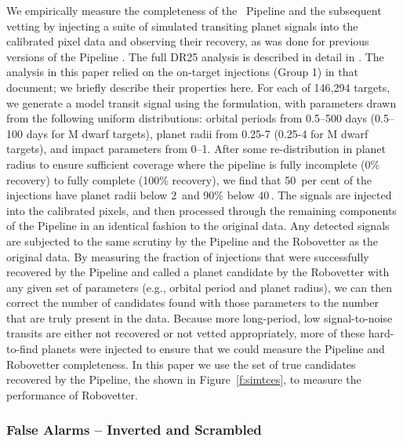 We empirically measure the completeness of the \Kepler\ Pipeline and the subsequent vetting by injecting a suite of simulated transiting planet signals into the calibrated pixel data and observing their recovery, as was done for previous versions of the \Kepler{} Pipeline \citep{Christiansen2013a,Christiansen2015,Christiansen2016}. The full DR25 analysis is described in detail in \citet{Christiansen2017}. The analysis in this paper relied on the on-target injections (Group 1) in that document; we briefly describe their properties here. For each of 146,294 targets, we generate a model transit signal using the \citet{Mandel2002} formulation, with parameters drawn from the following uniform distributions: orbital periods from 0.5--500 days (0.5--100 days for M dwarf targets), planet radii from 0.25-7 \re{} (0.25-4 \re{} for M dwarf targets), and impact parameters from 0--1. After some re-distribution in planet radius to ensure sufficient coverage where the pipeline is fully incomplete (0\% recovery) to fully complete (100\% recovery), we find that 50~per cent of the injections have planet radii below 2\,\re{} and 90\% below 40\,\re{}. The signals are injected into the calibrated pixels, and then processed through the remaining components of the \Kepler{} Pipeline in an identical fashion to the original data. Any detected signals are subjected to the same scrutiny by the Pipeline and the Robovetter as the original data. By measuring the fraction of injections that were successfully recovered by the Pipeline and called a planet candidate by the Robovetter with any given set of parameters (e.g., orbital period and planet radius), we can then correct the number of candidates found with those parameters to the number that are truly present in the data. Because more long-period, low signal-to-noise transits are either not recovered or not vetted appropriately, more of these hard-to-find planets were injected to ensure that we could measure the Pipeline and Robovetter completeness. In this paper we use the set of true candidates recovered by the Pipeline, the  shown in Figure~\ref{f:simtces}, to measure the performance of Robovetter.


\subsubsection{False Alarms -- Inverted and Scrambled} 

